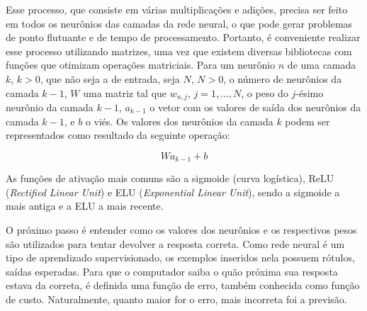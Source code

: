 Esse processo, que consiste em várias multiplicações e adições, precisa ser feito em todos os neurônios das camadas da rede neural, o que pode gerar problemas de ponto flutuante e de tempo de processamento.
Portanto, é conveniente realizar esse processo utilizando matrizes, uma vez que existem diversas bibliotecas com funções que otimizam operações matriciais.
Para um neurônio $n$ de uma camada $k$, $k > 0$, que não seja a de entrada, seja $N$, $N > 0$, o número de neurônios da camada $k-1$, $W$ uma matriz tal que $w_{n, j}$, $j = 1, ..., N$, o peso do $j$-ésimo neurônio da camada $k-1$, $a_{k-1}$ o vetor com os valores de saída dos neurônios da camada $k-1$, e $b$ o viés.
Os valores dos neurônios da camada $k$ podem ser representados como resultado da seguinte operação:

\begin{equation} \label{eq:nn02}
Wa_{k-1} + b
\end{equation}

As funções de ativação mais comuns são a sigmoide (curva logística), ReLU (\textit{Rectified Linear Unit}) e ELU (\textit{Exponential Linear Unit}), sendo a sigmoide a mais antiga e a ELU a mais recente.

O próximo passo é entender como os valores dos neurônios e os respectivos pesos são utilizados para tentar devolver a resposta correta.
Como rede neural é um tipo de aprendizado supervisionado, os exemplos inseridos nela possuem rótulos, saídas esperadas.
Para que o computador saiba o quão próxima sua resposta estava da correta, é definida uma função de erro, também conhecida como função de custo.
Naturalmente, quanto maior for o erro, mais incorreta foi a previsão.%

